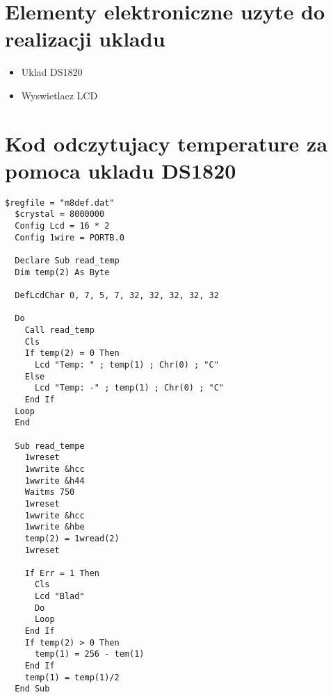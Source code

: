 \documentclass{article}
\begin{document}
\section{Elementy elektroniczne uzyte do realizacji ukladu}
\begin{itemize}
  \item Uklad DS1820
  \item Wyswietlacz LCD
\end{itemize}

\section{Kod odczytujacy temperature za pomoca ukladu DS1820}

\begin{lstlisting}[language=VBScript , caption=Kod odczytujacy temperature za pomoca ukladu DS1820]
  $regfile = "m8def.dat"
  $crystal = 8000000
  Config Lcd = 16 * 2
  Config 1wire = PORTB.0

  Declare Sub read_temp
  Dim temp(2) As Byte

  DefLcdChar 0, 7, 5, 7, 32, 32, 32, 32, 32

  Do
    Call read_temp
    Cls
    If temp(2) = 0 Then
      Lcd "Temp: " ; temp(1) ; Chr(0) ; "C"
    Else
      Lcd "Temp: -" ; temp(1) ; Chr(0) ; "C"
    End If
  Loop
  End

  Sub read_tempe
    1wreset
    1wwrite &hcc
    1wwrite &h44
    Waitms 750
    1wreset
    1wwrite &hcc
    1wwrite &hbe
    temp(2) = 1wread(2)
    1wreset

    If Err = 1 Then
      Cls
      Lcd "Blad"
      Do
      Loop
    End If
    If temp(2) > 0 Then
      temp(1) = 256 - tem(1)
    End If
    temp(1) = temp(1)/2
  End Sub
\end{lstlisting}
\end{document}

